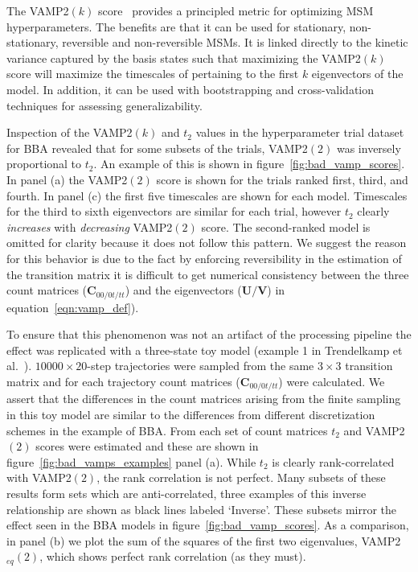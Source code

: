 \documentclass[journal=jacsat,manuscript=article]{achemso}
\begin{document}
The VAMP2$(k)$ score~\cite{wuVariationalApproachLearning2020c} provides a principled metric for optimizing MSM hyperparameters. The benefits are that it can be used for stationary, non-stationary, reversible and non-reversible MSMs. It is linked directly to the kinetic variance captured by the basis states such that maximizing the VAMP2$(k)$ score will maximize the timescales of pertaining to the first $k$ eigenvectors of the model. In addition, it can be used with bootstrapping and cross-validation techniques for assessing generalizability. 

Inspection of the VAMP2$(k)$ and $t_2$ values in the hyperparameter trial dataset for BBA revealed that for some subsets of the trials, VAMP2$(2)$ was inversely proportional to $t_2$. An example of this is shown in figure~\ref{fig:bad_vamp_scores}. In panel (a) the VAMP2$(2)$ score is shown for the trials ranked first, third, and fourth. In panel (c) the first five timescales are shown for each model. Timescales for the third to sixth eigenvectors are similar for each trial, however $t_2$ clearly \emph{increases} with \emph{decreasing} VAMP2$(2)$ score. The second-ranked model is omitted for clarity because it does not follow this pattern. We suggest the reason for this behavior is due to the fact by enforcing reversibility in the estimation of the transition matrix it is difficult to get numerical consistency between the three count matrices ($\mathbf{C}_{00/0t/tt}$) and the eigenvectors ($\mathbf{U}/\mathbf{V}$) in equation~\ref{eqn:vamp_def}). 

To ensure that this phenomenon was not an artifact of the processing pipeline the effect was replicated with a three-state toy model (example 1 in Trendelkamp et al.~\cite{trendelkamp-schroer_estimation_2015}). $\num{10000}\times20$-step trajectories were sampled from the same $3\times 3$ transition matrix and for each trajectory count matrices ($\mathbf{C}_{00/0t/tt}$) were calculated.  We assert that the differences in the count matrices arising from the finite sampling in this toy model are similar to the differences from different discretization schemes in the example of BBA.  From each set of count matrices $t_2$ and VAMP2$(2)$ scores were estimated and  these are shown in figure~\ref{fig:bad_vamps_examples} panel (a). While  $t_2$ is clearly rank-correlated with VAMP2$(2)$, the rank correlation is not perfect.  Many subsets of these results form sets which are anti-correlated,  three examples of this inverse relationship are shown as black lines labeled `Inverse'. These subsets mirror the effect seen in the BBA models in figure~\ref{fig:bad_vamp_scores}.  As a comparison, in panel (b) we plot the sum of the squares of the first two eigenvalues, VAMP2$_{eq}(2)$, which shows perfect rank correlation (as they must). 
\end{document}
